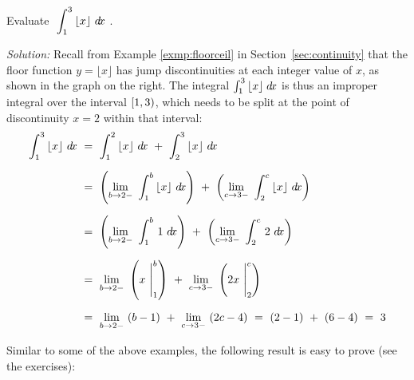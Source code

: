 \begin{exmp}\label{exmp:improper8}
\noindent Evaluate $~\displaystyle\int_{1}^{3}\,\lfloor x \rfloor~d\!x~$.\vspace{1mm}
\par\noindent\emph{Solution:} Recall from Example \ref{exmp:floorceil} in
Section~\ref{sec:continuity} that the floor function $y=\lfloor x \rfloor$ has jump
discontinuities at each integer value of $x$, as shown in the graph on the
right. The integral $\int_{1}^{3}\,\lfloor x \rfloor\;d\!x$ is thus an improper
integral over the interval $\lbrack 1,3 )$, which needs to be split at the point
of discontinuity $x=2$ within that interval:
\begin{align*}
\int_{1}^{3}\,\lfloor x \rfloor~d\!x ~&=~ \int_{1}^{2}\,\lfloor x \rfloor~d\!x ~+~
\int_{2}^{3}\,\lfloor x \rfloor~d\!x\\[6pt]
&=~ \left(\lim_{b \to 2-}~\int_{1}^{b}\,\lfloor x \rfloor~d\!x\right) ~+~
    \left(\lim_{c \to 3-}~\int_{2}^{c}\,\lfloor x \rfloor~d\!x\right)\\[6pt]
&=~ \left(\lim_{b \to 2-}~\int_{1}^{b}\,1~d\!x\right) ~+~
    \left(\lim_{c \to 3-}~\int_{2}^{c}\,2~d\!x\right)\\[6pt]
&=~ \lim_{b \to 2-}~\left(x~\Biggr|_1^{b}\right) ~+~
    \lim_{c \to 3-}~\left(2x~\Biggr|_2^{c}\right)\\[6pt]
&=~ \lim_{b \to 2-}~(b - 1) ~+~ \lim_{c \to 3-}~(2c - 4) ~=~ (2-1) ~+~ (6-4) ~=~ 3
\end{align*}
\end{exmp}
\divider
\vspace{2mm}
Similar to some of the above examples, the following result is easy to prove
(see the exercises):

